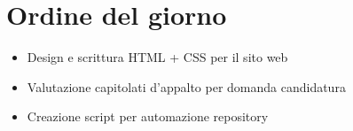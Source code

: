 \section{Ordine del giorno}

\begin{itemize}
    \item Design e scrittura HTML + CSS per il sito web
    \item Valutazione capitolati d'appalto per domanda candidatura
 	\item Creazione script per automazione repository
\end{itemize}